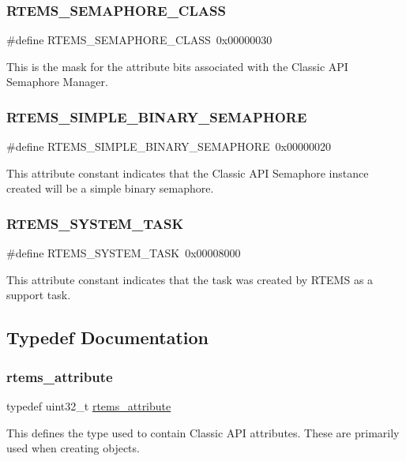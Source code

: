 \subsubsection{\texorpdfstring{RTEMS\_SEMAPHORE\_CLASS}{RTEMS\_SEMAPHORE\_CLASS}}
{\footnotesize\ttfamily \#define R\+T\+E\+M\+S\+\_\+\+S\+E\+M\+A\+P\+H\+O\+R\+E\+\_\+\+C\+L\+A\+SS~0x00000030}

This is the mask for the attribute bits associated with the Classic A\+PI Semaphore Manager. \mbox{\label{group__ClassicAttributes_gaa806ca5ba678b04af0e288363410d39a}} 
\subsubsection{\texorpdfstring{RTEMS\_SIMPLE\_BINARY\_SEMAPHORE}{RTEMS\_SIMPLE\_BINARY\_SEMAPHORE}}
{\footnotesize\ttfamily \#define R\+T\+E\+M\+S\+\_\+\+S\+I\+M\+P\+L\+E\+\_\+\+B\+I\+N\+A\+R\+Y\+\_\+\+S\+E\+M\+A\+P\+H\+O\+RE~0x00000020}

This attribute constant indicates that the Classic A\+PI Semaphore instance created will be a simple binary semaphore. \mbox{\label{group__ClassicAttributes_ga399eca8780d45f30c28e6bd9a806caf2}} 
\subsubsection{\texorpdfstring{RTEMS\_SYSTEM\_TASK}{RTEMS\_SYSTEM\_TASK}}
{\footnotesize\ttfamily \#define R\+T\+E\+M\+S\+\_\+\+S\+Y\+S\+T\+E\+M\+\_\+\+T\+A\+SK~0x00008000}

This attribute constant indicates that the task was created by R\+T\+E\+MS as a support task. 

\subsection{Typedef Documentation}
\mbox{\label{group__ClassicAttributes_gaea40313cf78ed843e09c4315d0a10f79}} 
\subsubsection{\texorpdfstring{rtems\_attribute}{rtems\_attribute}}
{\footnotesize\ttfamily typedef uint32\+\_\+t \mbox{\hyperlink{group__ClassicAttributes_gaea40313cf78ed843e09c4315d0a10f79}{rtems\+\_\+attribute}}}

This defines the type used to contain Classic A\+PI attributes. These are primarily used when creating objects. 